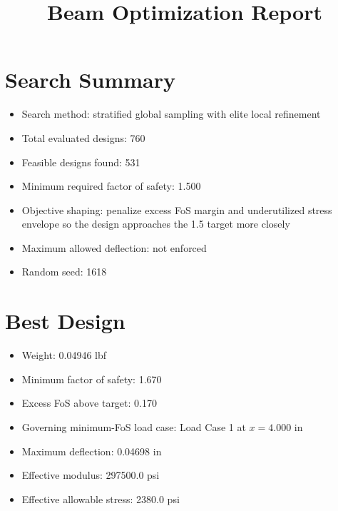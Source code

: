 \documentclass[11pt]{article}
\title{Beam Optimization Report}
\date{}
\begin{document}
\maketitle

\section*{Search Summary}
\begin{itemize}
\item Search method: stratified global sampling with elite local refinement
\item Total evaluated designs: 760
\item Feasible designs found: 531
\item Minimum required factor of safety: 1.500
\item Objective shaping: penalize excess FoS margin and underutilized stress envelope so the design approaches the 1.5 target more closely
\item Maximum allowed deflection: not enforced
\item Random seed: 1618
\end{itemize}

\section*{Best Design}
\begin{itemize}
\item Weight: 0.04946 lbf
\item Minimum factor of safety: 1.670
\item Excess FoS above target: 0.170
\item Governing minimum-FoS load case: Load Case 1 at $x=4.000$ in
\item Maximum deflection: 0.04698 in
\item Effective modulus: 297500.0 psi
\item Effective allowable stress: 2380.0 psi
\end{itemize}
\end{document}
